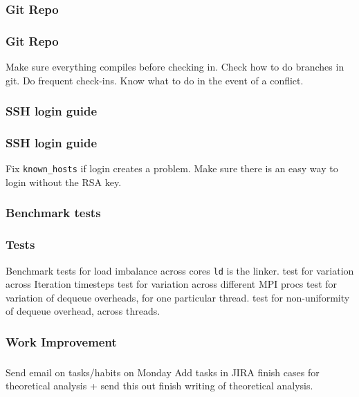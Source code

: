 \subsubsection{Git Repo}
\begin{frame}
\frametitle{Git Repo}
\begin{enumerate} 
\bllt Make sure everything compiles before checking in. 
\bllt Check how to do branches in git. 
\bllt Do frequent check-ins. 
\bllt Know what to do in the event of a conflict. 
\end{enumerate} 
\end{frame} 

\subsubsection{SSH login guide}
\begin{frame}
\frametitle{SSH login guide}
\begin{enumerate} 
\bllt Fix \texttt{known\_hosts} if login creates a problem. 
\bllt Make sure there is an easy way to login without the RSA key.
\end{enumerate} 
\end{frame} 

\subsubsection{Benchmark tests}
\begin{frame}
\frametitle{Tests}
\begin{enumerate} 
\bllt Benchmark tests for load imbalance across cores \texttt{ld} is the linker.
\bllt test for variation across Iteration timesteps
\bllt test for variation across different MPI procs 
\bllt test for variation of dequeue overheads, for one particular thread. 
\bllt test for non-uniformity of dequeue overhead, across threads. 
\end{enumerate} 
\end{frame} 

\subsubsection{Work Improvement}
\begin{frame}
\frametitle{ }
\begin{enumerate} 
\bllt Send email on tasks/habits on Monday
\bllt Add tasks in JIRA 
\bllt finish cases for theoretical analysis + send this out
\bllt finish writing of theoretical analysis. 
\end{enumerate} 
\end{frame} 
